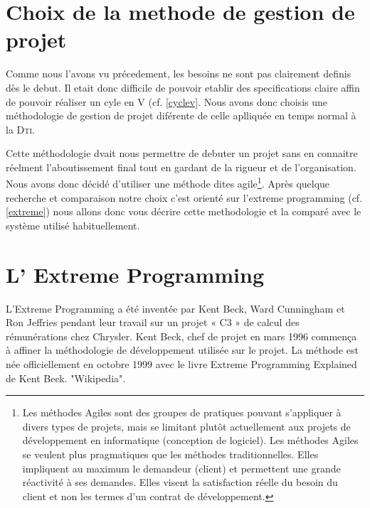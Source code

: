 
\section{Choix de la methode de gestion de projet}
Comme nous l'avons vu précedement, les besoins ne sont pas clairement definis dès le debut. Il etait donc difficile de pouvoir etablir des specifications claire affin de pouvoir réaliser un cyle en V (cf. \vref{cyclev}. Nous avons donc choisis une méthodologie de gestion de projet diférente de celle aplliquée en temps normal à la \textsc{Dti}.

Cette méthodologie dvait nous permettre de debuter un projet sans en connaitre réelment l'aboutissement final tout en gardant de la rigueur et de l'organisation. Nous avons donc décidé d'utiliser une méthode dites agile\footnote{Les méthodes Agiles sont des groupes de pratiques pouvant s'appliquer à divers types de projets, mais se limitant plutôt actuellement aux projets de développement en informatique (conception de logiciel). Les méthodes Agiles se veulent plus pragmatiques que les méthodes traditionnelles. Elles impliquent au maximum le demandeur (client) et permettent une grande réactivité à ses demandes. Elles visent la satisfaction réelle du besoin du client et non les termes d'un contrat de développement. }. Après quelque recherche et comparaison notre choix c'est orienté sur l'extreme programming (cf. \vref{extreme}) nous allons donc vous décrire cette methodologie et la comparé avec le système utilisé habituellement.

\section{L' Extreme Programming}
L'Extreme Programming a été inventée par Kent Beck, Ward Cunningham et Ron Jeffries pendant leur travail sur un projet « C3 » de calcul des rémunérations chez Chrysler. Kent Beck, chef de projet en mars 1996 commença à affiner la méthodologie de développement utilisée sur le projet. La méthode est née officiellement en octobre 1999 avec le livre Extreme Programming Explained de Kent Beck. "Wikipedia".

